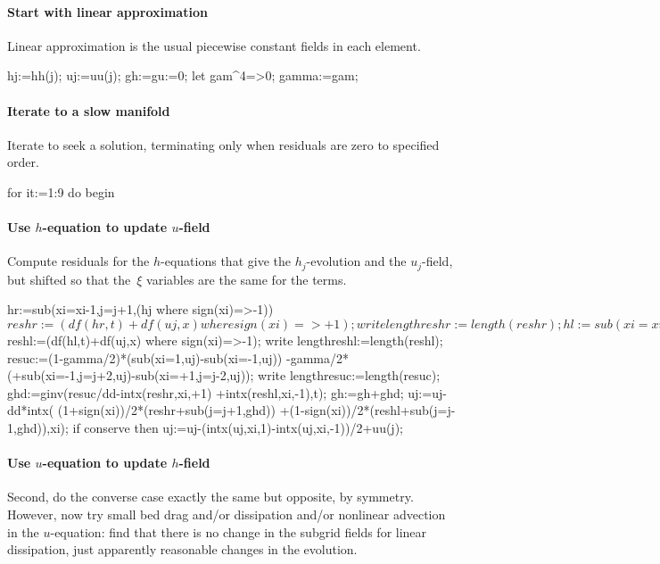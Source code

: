 \documentclass[10pt,a5paper]{article}
\begin{document}
\paragraph{Start with linear approximation}
Linear approximation is the usual piecewise constant fields in each element.
\begin{reduce}
hj:=hh(j); uj:=uu(j);
gh:=gu:=0;
let gam^4=>0;
gamma:=gam;
\end{reduce}

\paragraph{Iterate to a slow manifold}
Iterate to seek a solution, terminating only when residuals are zero to specified order.
\begin{reduce}
for it:=1:9 do begin
\end{reduce}

\paragraph{Use $h$-equation to update $u$-field}
Compute residuals for the $h$-equations that give the $h_j$-evolution and the $u_j$-field, but shifted so that the~$\xi$
variables are the same for the terms.  

\begin{reduce}
hr:=sub({xi=xi-1,j=j+1},(hj where sign(xi)=>-1))$
reshr:=(df(hr,t)+df(uj,x) where sign(xi)=>+1);
write lengthreshr:=length(reshr);
hl:=sub({xi=xi+1,j=j-1},(hj  where sign(xi)=>+1))$
reshl:=(df(hl,t)+df(uj,x) where sign(xi)=>-1);
write lengthreshl:=length(reshl);
resuc:=(1-gamma/2)*(sub(xi=1,uj)-sub(xi=-1,uj))
         -gamma/2*(+sub({xi=-1,j=j+2},uj)-sub({xi=+1,j=j-2},uj));
write lengthresuc:=length(resuc);
ghd:=ginv(resuc/dd-intx(reshr,xi,+1)
                  +intx(reshl,xi,-1),t);
gh:=gh+ghd;
uj:=uj-dd*intx( (1+sign(xi))/2*(reshr+sub(j=j+1,ghd))
               +(1-sign(xi))/2*(reshl+sub(j=j-1,ghd)),xi);
if conserve then uj:=uj-(intx(uj,xi,1)-intx(uj,xi,-1))/2+uu(j);
\end{reduce}

\paragraph{Use $u$-equation to update $h$-field}
Second, do the converse case exactly the same but opposite, by symmetry.  However, now try small bed drag and/or dissipation and/or nonlinear advection in the $u$-equation: find that there is no change in the subgrid fields for linear dissipation, just apparently reasonable changes in the evolution.  
\end{document}
